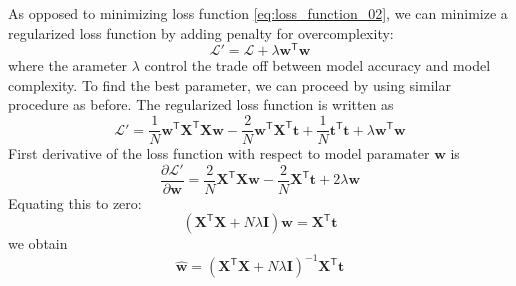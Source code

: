 \documentclass[a4paper,11pt]{article} %
\begin{document}
As opposed to minimizing loss function \eqref{eq:loss_function_02}, we can minimize
a regularized loss function by adding penalty for overcomplexity:
\begin{equation}
\mathcal{L}' = \mathcal{L} + \lambda \mathbf{w}^{\mathsf{T}} \mathbf{w}
\end{equation}
where the arameter $\lambda$ control the trade off between model accuracy and
model complexity.
To find the best parameter, we can proceed by using similar procedure as before.
The regularized loss function is written as
\begin{equation}
\mathcal{L}' = \frac{1}{N} \mathbf{w}^{\mathsf{T}} \mathbf{X}^{\mathsf{T}} \mathbf{X} \mathbf{w}
- \frac{2}{N} \mathbf{w}^{\mathsf{T}} \mathbf{X}^{\mathsf{T}} \mathbf{t}
+ \frac{1}{N} \mathbf{t}^{\mathsf{T}} \mathbf{t}
+ \lambda \mathbf{w}^{\mathsf{T}} \mathbf{w}
\end{equation}
First derivative of the loss function with respect to model paramater $\mathbf{w}$ is
\begin{equation}
\frac{\partial \mathcal{L}'}{\partial \mathbf{w}} =
\frac{2}{N} \mathbf{X}^{\mathsf{T}} \mathbf{X} \mathbf{w}
- \frac{2}{N} \mathbf{X}^{\mathsf{T}} \mathbf{t} + 2\lambda\mathbf{w}
\end{equation}
Equating this to zero:
\begin{equation}
( \mathbf{X}^{\mathsf{T}} \mathbf{X} + N \lambda \mathbf{I} ) \mathbf{w} = \mathbf{X}^{\mathsf{T}} \mathbf{t}
\end{equation}
we obtain
\begin{equation}
\hat{\mathbf{w}} =
( \mathbf{X}^{\mathsf{T}} \mathbf{X} + N \lambda \mathbf{I} )^{-1}
\mathbf{X}^{\mathsf{T}} \mathbf{t}
\end{equation}





\end{document}
